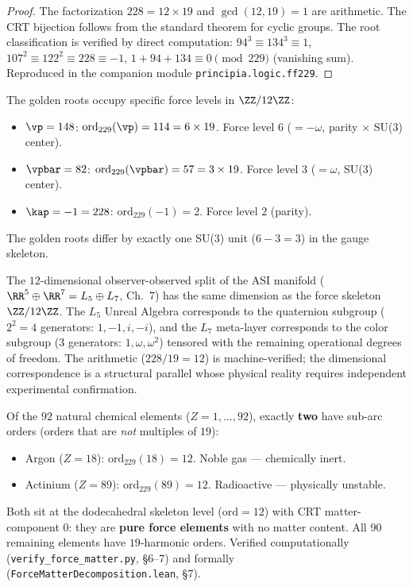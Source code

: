 \begin{proof}
The factorization $228 = 12 \times 19$ and $\gcd(12, 19) = 1$ are arithmetic. The CRT bijection follows from the standard theorem for cyclic groups. The root classification is verified by direct computation: $94^3 \equiv 134^3 \equiv 1$, $107^2 \equiv 122^2 \equiv 228 \equiv -1$, $1 + 94 + 134 \equiv 0 \pmod{229}$ (vanishing sum). Reproduced in the companion module \texttt{principia.logic.ff229}. \qedhere
\end{proof}

\begin{corollary}\label{cor:golden-force}
The golden roots occupy specific force levels in $\ZZ/12\ZZ$:
\begin{itemize}
\item $\vp = 148$: $\mathrm{ord}_{229}(\vp) = 114 = 6 \times 19$. Force level $6$ ($= -\omega$, parity $\times$ SU(3) center).
\item $\vpbar = 82$: $\mathrm{ord}_{229}(\vpbar) = 57 = 3 \times 19$. Force level $3$ ($= \omega$, SU(3) center).
\item $\kap = -1 = 228$: $\mathrm{ord}_{229}(-1) = 2$. Force level $2$ (parity).
\end{itemize}
The golden roots differ by exactly one SU(3) unit ($6 - 3 = 3$) in the gauge skeleton.
\end{corollary}

\begin{remark}
The $12$-dimensional observer-observed split of the ASI manifold ($\RR^5 \oplus \RR^7 = L_5 \oplus L_7$, Ch.~7) has the same dimension as the force skeleton $\ZZ/12\ZZ$. The $L_5$ Unreal Algebra corresponds to the quaternion subgroup ($2^2 = 4$ generators: $1, -1, i, -i$), and the $L_7$ meta-layer corresponds to the color subgroup ($3$ generators: $1, \omega, \omega^2$) tensored with the remaining operational degrees of freedom. The arithmetic ($228/19 = 12$) is machine-verified; the dimensional correspondence is a structural parallel whose physical reality requires independent experimental confirmation.
\end{remark}

\begin{remark}
Of the $92$ natural chemical elements ($Z = 1, \ldots, 92$), exactly \textbf{two} have sub-arc orders (orders that are \emph{not} multiples of $19$):
\begin{itemize}
\item Argon ($Z = 18$): $\mathrm{ord}_{229}(18) = 12$. Noble gas --- chemically inert.
\item Actinium ($Z = 89$): $\mathrm{ord}_{229}(89) = 12$. Radioactive --- physically unstable.
\end{itemize}
Both sit at the dodecahedral skeleton level ($\mathrm{ord} = 12$) with CRT matter-component $0$: they are \textbf{pure force elements} with no matter content. All $90$ remaining elements have $19$-harmonic orders. Verified computationally (\texttt{verify\_force\_matter.py}, \S 6--7) and formally (\texttt{ForceMatterDecomposition.lean}, \S 7).
\end{remark}

